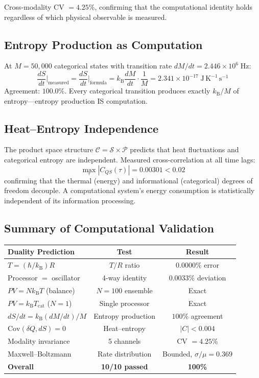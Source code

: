 \documentclass[twocolumn,10pt,a4paper]{article}
\theoremstyle{plain}
\theoremstyle{definition}
\theoremstyle{remark}
\newcommand{\kB}{k_{\mathrm{B}}}
\newcommand{\Sspace}{\mathcal{S}}
\newcommand{\Cat}{\mathcal{C}}
\newcommand{\Partition}{\mathcal{P}}
\begin{document}
Cross-modality CV $= 4.25\%$, confirming that the computational identity holds regardless of which physical observable is measured.

\subsection{Entropy Production as Computation}

At $M = 50{,}000$ categorical states with transition rate $dM/dt = 2.446 \times 10^6\;\mathrm{Hz}$:
\begin{equation}
    \frac{dS}{dt}\bigg|_{\mathrm{measured}} = \frac{dS}{dt}\bigg|_{\mathrm{formula}} = \kB \frac{dM}{dt} \cdot \frac{1}{M} = 2.341 \times 10^{-17}\;\mathrm{J\,K^{-1}\,s^{-1}}
\end{equation}
Agreement: $100.0\%$. Every categorical transition produces exactly $\kB/M$ of entropy---entropy production IS computation.

\subsection{Heat--Entropy Independence}

The product space structure $\Cat = \Sspace \times \Partition$ predicts that heat fluctuations and categorical entropy are independent. Measured cross-correlation at all time lags:
\begin{equation}
    \max_\tau |C_{QS}(\tau)| = 0.00301 < 0.02
\end{equation}
confirming that the thermal (energy) and informational (categorical) degrees of freedom decouple. A computational system's energy consumption is statistically independent of its information processing.

\subsection{Summary of Computational Validation}

\begin{center}
\begin{tabular}{lcc}
\toprule
Duality Prediction & Test & Result \\
\midrule
$T = (\hbar/\kB) R$ & $T/R$ ratio & $0.0000\%$ error \\
Processor $=$ oscillator & 4-way identity & $0.0033\%$ deviation \\
$PV = N\kB T$ (balance) & $N = 100$ ensemble & Exact \\
$PV = \kB T_{\mathrm{cat}}$ ($N = 1$) & Single processor & Exact \\
$dS/dt = \kB(dM/dt)/M$ & Entropy production & $100\%$ agreement \\
$\mathrm{Cov}(\delta Q, dS) = 0$ & Heat--entropy & $|C| < 0.004$ \\
Modality invariance & 5 channels & CV $= 4.25\%$ \\
Maxwell--Boltzmann & Rate distribution & Bounded, $\sigma/\mu = 0.369$ \\
\midrule
\textbf{Overall} & \textbf{10/10 passed} & \textbf{100\%} \\
\bottomrule
\end{tabular}
\end{center}
\end{document}
